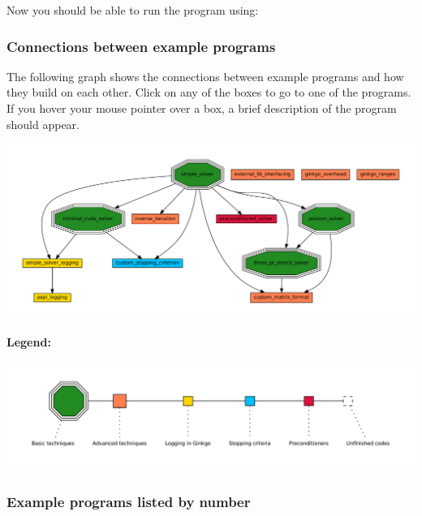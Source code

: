 Now you should be able to run the program using\+:




\label{_graph}%
 \label{Examples_ExampleConnectionGraph}%
%
 \subsubsection*{Connections between example programs}

The following graph shows the connections between example programs and how they build on each other. Click on any of the boxes to go to one of the programs. If you hover your mouse pointer over a box, a brief description of the program should appear. 
\begin{DoxyImageNoCaption}
  \mbox{\includegraphics[width=\textwidth,height=\textheight/2,keepaspectratio=true]{dot_inline_dotgraph_1}}
\end{DoxyImageNoCaption}


{\bfseries Legend\+:}~\newline
 
\begin{DoxyImageNoCaption}
  \mbox{\includegraphics[width=\textwidth,height=\textheight/2,keepaspectratio=true]{dot_inline_dotgraph_2}}
\end{DoxyImageNoCaption}


\label{_list}%
 \subsubsection*{Example programs listed by number}

